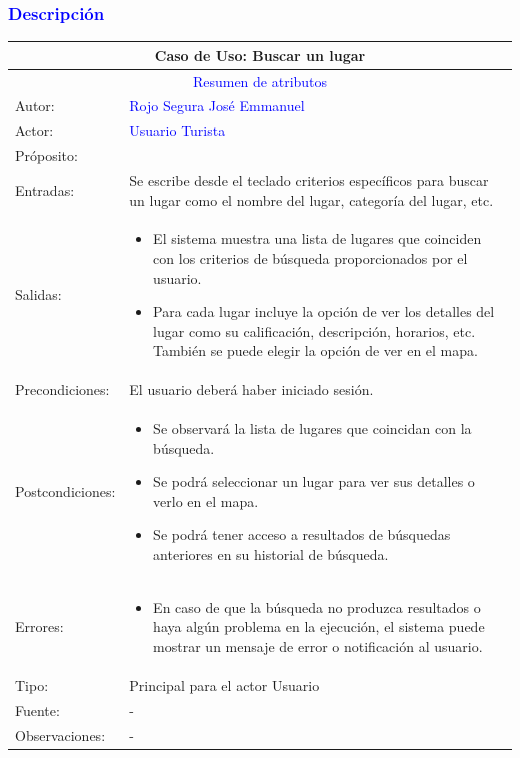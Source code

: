 \subsubsection{\textcolor{blue}{Descripción}}
\begin{tabularx}{16cm}{||l|X||}
	\hline
	\multicolumn{2}{||c||}{Caso de Uso: Buscar un lugar } \\
	\hline
	\multicolumn{2}{||c||}{\textcolor{blue}{Resumen de atributos}} \\
         \hline
	{Autor:} & {\textcolor{blue}{Rojo Segura José Emmanuel}} \\
	\hline
	\hline
	{Actor:} & {\textcolor{blue}{Usuario Turista}} \\
	\hline
	{Próposito:} & {} \\
	\hline
	{Entradas:} &  Se escribe desde el teclado criterios específicos para buscar un lugar como el nombre del lugar, categoría del lugar, etc.\\
	\hline
	{Salidas:} & 
        \begin{itemize}
        \item El sistema muestra una lista de lugares que coinciden con los criterios de búsqueda proporcionados por el usuario.
        \item Para cada lugar incluye la opción de ver los detalles del lugar como su calificación, descripción, horarios, etc. También se puede elegir la opción de ver en el mapa.
        \end{itemize} \\
	\hline
	{Precondiciones:} & El usuario deberá haber iniciado sesión.\\ 
	\hline
	{Postcondiciones:} & 
         \begin{itemize}
            \item Se observará la lista de lugares que coincidan con la búsqueda.
            \item Se podrá seleccionar un lugar para ver sus detalles o verlo en el mapa.
            \item Se podrá tener acceso a resultados de búsquedas anteriores en su historial de búsqueda.
        \end{itemize}\\
	\hline
	{Errores:} & \begin{itemize}
        \item En caso de que la búsqueda no produzca resultados o haya algún problema en la ejecución, el sistema puede mostrar un mensaje de error o notificación al usuario.
        \end{itemize}\\
	\hline
	{Tipo:} & Principal para el actor Usuario\\
	\hline
	{Fuente:} & {-} \\
	\hline
	{Observaciones:} & {-} \\
	\hline
\end{tabularx}

